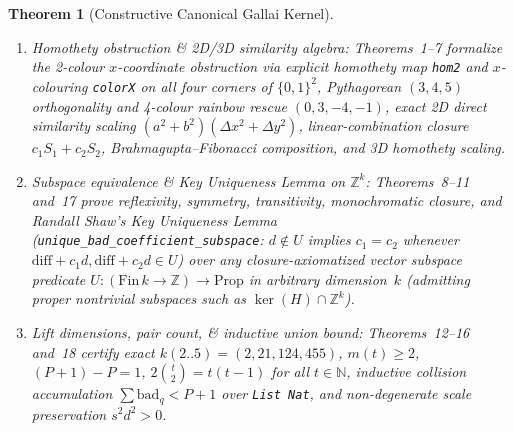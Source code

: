 \documentclass[11pt,twocolumn]{article}
\newtheorem{theorem}{Theorem}
\newcommand{\ZZ}{\mathbb{Z}}
\newcommand{\NN}{\mathbb{N}}
\begin{document}
\begin{theorem}[Constructive Canonical Gallai Kernel]\label{thm:lean}
\leavevmode
\begin{enumerate}[leftmargin=*,nosep]
  \item \emph{Homothety obstruction \& 2D/3D similarity algebra:} Theorems~1--7 formalize the 2-colour $x$-coordinate obstruction via explicit homothety map \texttt{hom2} and $x$-colouring \texttt{colorX} on all four corners of $\{0,1\}^2$, Pythagorean $(3,4,5)$ orthogonality and 4-colour rainbow rescue $(0,3,-4,-1)$, exact 2D direct similarity scaling $(a^2+b^2)(\Delta x^2 + \Delta y^2)$, linear-combination closure $c_1 S_1 + c_2 S_2$, Brahmagupta--Fibonacci composition, and 3D homothety scaling.
  \item \emph{Subspace equivalence \& Key Uniqueness Lemma on $\ZZ^k$:} Theorems~8--11 and~17 prove reflexivity, symmetry, transitivity, monochromatic closure, and Randall Shaw's Key Uniqueness Lemma (\texttt{unique\_\allowbreak bad\_\allowbreak coefficient\_\allowbreak subspace}: $d \notin U$ implies $c_1 = c_2$ whenever $\mathrm{diff} + c_1 d, \mathrm{diff} + c_2 d \in U$) over any closure-axiomatized vector subspace predicate $U : (\mathrm{Fin}\,k \to \ZZ) \to \mathrm{Prop}$ in arbitrary dimension~$k$ (admitting proper nontrivial subspaces such as $\ker(H) \cap \ZZ^k$).
  \item \emph{Lift dimensions, pair count, \& inductive union bound:} Theorems~12--16 and~18 certify exact $k(2..5) = (2,21,124,455)$, $m(t) \ge 2$, $(P+1)-P=1$, $2\binom{t}{2} = t(t-1)$ for all $t \in \NN$, inductive collision accumulation $\sum \mathrm{bad}_q < P + 1$ over \texttt{List Nat}, and non-degenerate scale preservation $s^2 d^2 > 0$.
\end{enumerate}
\end{theorem}
\end{document}
